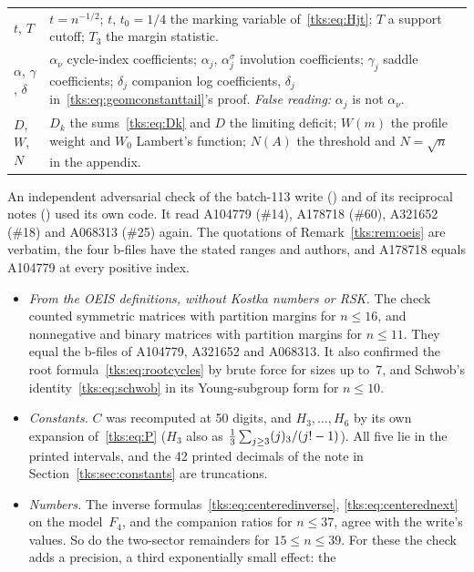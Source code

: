 \begin{longtable}{@{}>{\raggedright\arraybackslash}p{0.95in}>{\raggedright\arraybackslash}p{5.3in}@{}}
$t$, $T$ & $t=n^{-1/2}$; $t$, $t_0=1/4$ the marking variable of~\eqref{tks:eq:Hjt}; $T$ a support cutoff; $T_3$ the margin statistic.\\
$\alpha$, $\gamma$, $\delta$ & $\alpha_\nu$ cycle-index coefficients; $\alpha_j$, $\alpha_j^\sigma$ involution coefficients; $\gamma_j$ saddle coefficients; $\delta_j$ companion log coefficients, $\delta_j$ in~\eqref{tks:eq:geomconstanttail}'s proof. \emph{False reading:} $\alpha_j$ is not $\alpha_\nu$.\\
$D$, $W$, $N$ & $D_k$ the sums~\eqref{tks:eq:Dk} and $D$ the limiting deficit; $W(m)$ the profile weight and $W_0$ Lambert's function; $N(A)$ the threshold and $N=\sqrt n$ in the appendix.\\
\bottomrule
\end{longtable}
\endgroup
\begin{writenote}\raggedright
An independent adversarial check of the batch-113 write () and of its reciprocal notes
() used its own code. It read A104779 (\#14), A178718 (\#60), A321652 (\#18) and A068313 (\#25)
again. The quotations of Remark~\ref{tks:rem:oeis} are verbatim, the four b-files have the stated ranges and
authors, and A178718 equals A104779 at every positive index.
\begin{itemize}\raggedright
\item \emph{From the OEIS definitions, without Kostka numbers or RSK.} The check counted symmetric matrices with
partition margins for $n\le16$, and nonnegative and binary matrices with partition margins for $n\le11$. They equal
the b-files of A104779, A321652 and A068313. It also confirmed the root formula~\eqref{tks:eq:rootcycles} by brute
force for sizes up to~7, and Schwob's identity~\eqref{tks:eq:schwob} in its Young-subgroup form for $n\le10$.
\item \emph{Constants.} $C$ was recomputed at 50 digits, and $H_3,\ldots,H_6$ by its own expansion of~\eqref{tks:eq:P}
($H_3$ also as $\frac13\sum_{j\ge3}(j)_{3}/(j!-1)$). All five lie in the printed intervals, and the 42 printed
decimals of the note in Section~\ref{tks:sec:constants} are truncations.
\item \emph{Numbers.} The inverse formulas~\eqref{tks:eq:centeredinverse}, \eqref{tks:eq:centerednext} on the
model~$F_4$, and the companion ratios for $n\le37$, agree with the write's values. So do the two-sector
remainders for $15\le n\le39$. For these the check adds a precision, a third exponentially small effect: the

\end{itemize}
\end{writenote}
